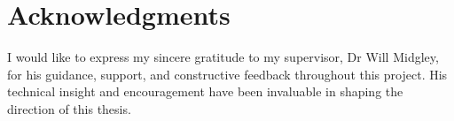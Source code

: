 \section*{Acknowledgments} \label{sec:acknowledgments}

I would like to express my sincere gratitude to my supervisor, Dr Will Midgley, for his guidance, support, and constructive feedback throughout this project. His technical insight and encouragement have been invaluable in shaping the direction of this thesis.
